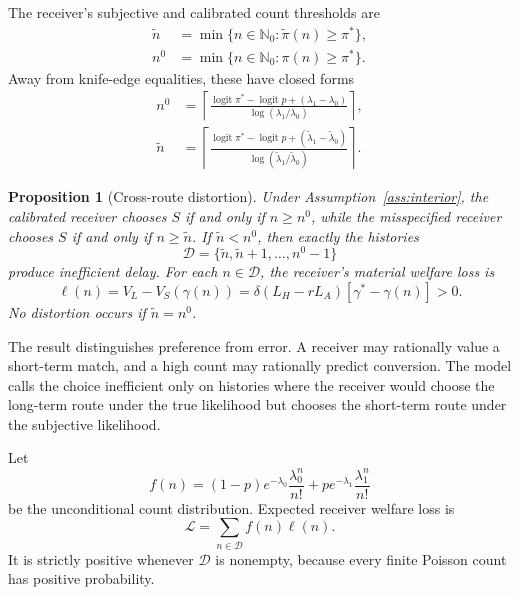 \documentclass[11pt]{article}
\newtheorem{proposition}{Proposition}
\newcommand{\logit}{\operatorname{logit}}
\begin{document}
The receiver's subjective and calibrated count thresholds are
\begin{align}
\widetilde n
&=\min\{n\in\mathbb N_0:\widetilde\pi(n)\geq\pi^*\},
\label{eq:ntilde}\\
n^0
&=\min\{n\in\mathbb N_0:\pi(n)\geq\pi^*\}. \label{eq:nzero}
\end{align}
Away from knife-edge equalities, these have closed forms
\begin{align}
n^0
&=\left\lceil
\frac{\logit\pi^*-\logit p+(\lambda_1-\lambda_0)}
{\log(\lambda_1/\lambda_0)}
\right\rceil, \label{eq:nzero-closed}\\
\widetilde n
&=\left\lceil
\frac{\logit\pi^*-\logit p
+(\widetilde\lambda_1-\widetilde\lambda_0)}
{\log(\widetilde\lambda_1/\widetilde\lambda_0)}
\right\rceil. \label{eq:ntilde-closed}
\end{align}

\begin{proposition}[Cross-route distortion]\label{prop:distortion}
Under Assumption~\ref{ass:interior}, the calibrated receiver chooses $S$ if and
only if $n\geq n^0$, while the misspecified receiver chooses $S$ if and only if
$n\geq\widetilde n$. If $\widetilde n<n^0$, then exactly the histories
\begin{equation}
\mathcal D=\{\widetilde n,\widetilde n+1,\ldots,n^0-1\} \label{eq:distortion-set}
\end{equation}
produce inefficient delay. For each $n\in\mathcal D$, the receiver's material
welfare loss is
\begin{equation}
\ell(n)
=V_L-V_S(\gamma(n))
=\delta(L_H-rL_A)\left[\gamma^*-\gamma(n)\right]>0. \label{eq:individual-loss}
\end{equation}
No distortion occurs if $\widetilde n=n^0$.
\end{proposition}

The result distinguishes preference from error. A receiver may rationally value
a short-term match, and a high count may rationally predict conversion. The
model calls the choice inefficient only on histories where the receiver would
choose the long-term route under the true likelihood but chooses the short-term
route under the subjective likelihood.

Let
\begin{equation}
f(n)=(1-p)e^{-\lambda_0}\frac{\lambda_0^n}{n!}
+p e^{-\lambda_1}\frac{\lambda_1^n}{n!} \label{eq:mixture-pmf}
\end{equation}
be the unconditional count distribution. Expected receiver welfare loss is
\begin{equation}
\mathcal L
=\sum_{n\in\mathcal D}f(n)\ell(n). \label{eq:expected-loss}
\end{equation}
It is strictly positive whenever $\mathcal D$ is nonempty, because every finite
Poisson count has positive probability.
\end{document}

